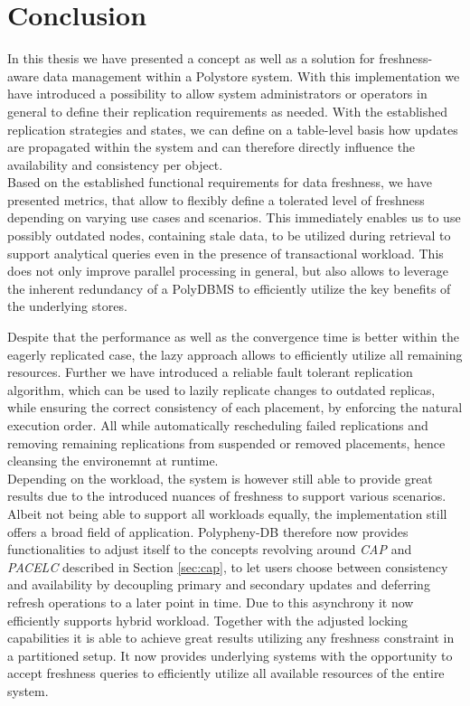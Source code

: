 \chapter{Conclusion}
\label{c:conclusion}

In this thesis we have presented a concept as well as a solution for freshness-aware data management within a Polystore system.
With this implementation we have introduced a possibility to allow system administrators or operators in general to define their replication requirements as needed. 
With the established replication strategies and states, we can define on a table-level basis how updates are propagated within the system and can therefore directly influence 
the availability and consistency per object.\\
Based on the established functional requirements for data freshness, we have presented metrics, that allow to flexibly define a tolerated level of freshness 
depending on varying use cases and scenarios.
This immediately enables us to use possibly outdated nodes, containing stale data, to be utilized during retrieval to support analytical queries even in the presence of 
transactional workload.
This does not only improve parallel processing in general, but also allows to leverage the inherent redundancy of a PolyDBMS
to efficiently utilize the key benefits of the underlying stores.



Despite that the performance as well as the convergence time is better within the eagerly replicated case, 
the lazy approach allows to efficiently utilize all remaining resources.
Further we have introduced a reliable fault tolerant replication algorithm, which can be used to lazily replicate changes to outdated replicas,
while ensuring the correct consistency of each placement, by enforcing the natural execution order. All while automatically rescheduling failed replications 
and removing remaining replications from suspended or removed placements, hence cleansing the environemnt at runtime.\\



Depending on the workload, the system is however still able to provide great results due to the introduced nuances of freshness to support various scenarios.
Albeit not being able to support all workloads equally, the implementation still offers a broad field of application.
Polypheny-DB therefore now provides functionalities to adjust itself to the concepts revolving around \emph{CAP} and \emph{PACELC} described in Section \ref{sec:cap},
to let users choose between consistency and availability by decoupling primary and secondary updates and deferring refresh operations to a later point in time.
Due to this asynchrony it now efficiently supports hybrid workload. 
Together with the adjusted locking capabilities it is able to achieve great results utilizing any freshness constraint in a partitioned setup.
It now provides underlying systems with the opportunity to accept freshness queries to efficiently utilize all available resources of the entire system.




